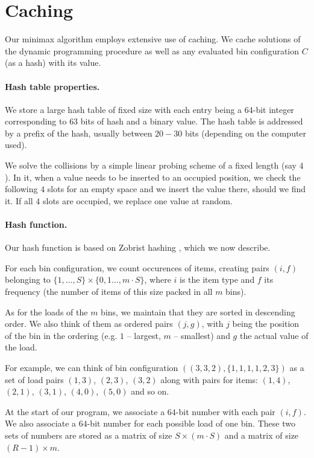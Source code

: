 \section{Caching}\label{sec:4:caching}

Our minimax algorithm employs extensive use of caching. We cache
solutions of the dynamic programming procedure \MaxFeas as well as any
evaluated bin configuration $C$ (as a hash) with its value.

\paragraph{Hash table properties.} We store a large hash table of
fixed size with each entry being a 64-bit integer corresponding to
$63$ bits of hash and a binary value. The hash table is addressed
by a prefix of the hash, usually between $20-30$ bits (depending
on the computer used).

We solve the collisions by a simple linear probing scheme of a fixed
length (say $4$). In it, when a value needs to be inserted to an
occupied position, we check the following $4$ slots for an empty space
and we insert the value there, should we find it. If all $4$ slots are
occupied, we replace one value at random.

\paragraph{Hash function.} Our hash function is based on Zobrist
hashing \cite{zobrist}, which we now describe.

For each bin configuration, we count occurences of items, creating
pairs $(i,f)$ belonging to $\{1,\ldots,S\} \times \{0,1\ldots,m\cdot
S\}$, where $i$ is the item type and $f$ its frequency (the number of
items of this size packed in all $m$ bins).

As for the loads of the $m$ bins, we maintain that they are sorted in
descending order. We also think of them as ordered pairs $(j,g)$, with
$j$ being the position of the bin in the ordering (e.g. $1$ --
largest, $m$ -- smallest) and $g$ the actual value of the load.

For example, we can think of bin configuration
$((3,3,2),\{1,1,1,1,2,3\})$ as a set of load pairs $(1,3)$, $(2,3)$,
$(3,2)$ along with pairs for items: $(1,4)$, $(2,1)$, $(3,1)$,
$(4,0)$, $(5,0)$ and so on.

At the start of our program, we associate a $64$-bit number with each
pair $(i,f)$. We also associate a $64$-bit number for each possible
load of one bin. These two sets of numbers are stored as a matrix of
size $S \times (m\cdot S)$ and a matrix of size $(R-1) \times m$.

